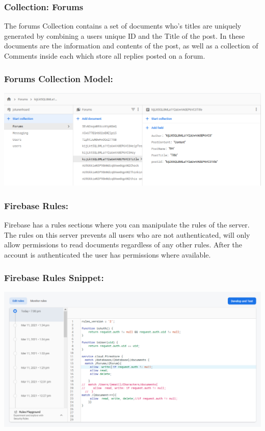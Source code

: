\subsubsection{Collection: Forums}
The forums Collection contains a set of documents who's titles are uniquely generated by combining a users unique ID and the Title of the post. In these documents are the information and contents of the post, as well as a collection of Comments inside each which store all replies posted on a forum.
\subsubsection{Forums Collection Model:}
\includegraphics[scale=0.3]{./img/Forums.png}
\subsubsection{Firebase Rules:}
Firebase has a rules sections where you can manipulate the rules of the server. The rules on this server prevents all users who are not authenticated, will only allow permissions to read documents regardless of any other rules. After the account is authenticated the user has permissions where available.
\subsubsection{Firebase Rules Snippet:}
\includegraphics[scale=0.3]{./img/FirebaseRules.png}
